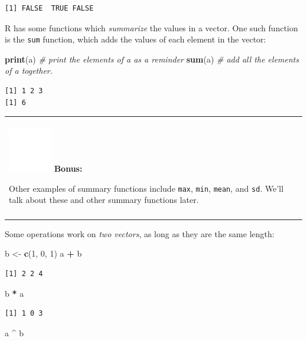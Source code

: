 \documentclass[
]{book}
\newenvironment{Shaded}{\begin{snugshade}}{\end{snugshade}}
\newcommand{\CommentTok}[1]{\textcolor[rgb]{0.56,0.35,0.01}{\textit{#1}}}
\newcommand{\DecValTok}[1]{\textcolor[rgb]{0.00,0.00,0.81}{#1}}
\newcommand{\KeywordTok}[1]{\textcolor[rgb]{0.13,0.29,0.53}{\textbf{#1}}}
\newcommand{\NormalTok}[1]{#1}
\newcommand{\OperatorTok}[1]{\textcolor[rgb]{0.81,0.36,0.00}{\textbf{#1}}}
\newcommand{\StringTok}[1]{\textcolor[rgb]{0.31,0.60,0.02}{#1}}
\newenvironment{bonus}
{
  \begin{center}
  \begin{tabular}{|>{\columncolor{bonus}\color{white}}p{0.9\textwidth}|}\hline\\
  \includegraphics[scale=0.1]{src/images/sun-fill-invert.png}
  \textbf{Bonus:}
}
{\\\\\hline
  \end{tabular}
  \end{center}
}
\begin{document}
\begin{verbatim}
[1] FALSE  TRUE FALSE
\end{verbatim}

R has some functions which \emph{summarize} the values in a vector.
One such function is the \texttt{sum} function, which adds the values of each element in the vector:

\begin{Shaded}
\begin{Highlighting}[]
\KeywordTok{print}\NormalTok{(a)  }\CommentTok{# print the elements of a as a reminder}
\KeywordTok{sum}\NormalTok{(a)    }\CommentTok{# add all the elements of a together.}
\end{Highlighting}
\end{Shaded}

\begin{verbatim}
[1] 1 2 3
[1] 6
\end{verbatim}

\begin{bonus}
Other examples of summary functions include \texttt{max}, \texttt{min},
\texttt{mean}, and \texttt{sd}. We'll talk about these and other summary
functions later.
\end{bonus}

Some operations work on \emph{two vectors}, as long as they are the same length:

\begin{Shaded}
\begin{Highlighting}[]
\NormalTok{b <-}\StringTok{ }\KeywordTok{c}\NormalTok{(}\DecValTok{1}\NormalTok{, }\DecValTok{0}\NormalTok{, }\DecValTok{1}\NormalTok{)}
\NormalTok{a }\OperatorTok{+}\StringTok{ }\NormalTok{b}
\end{Highlighting}
\end{Shaded}

\begin{verbatim}
[1] 2 2 4
\end{verbatim}

\begin{Shaded}
\begin{Highlighting}[]
\NormalTok{b }\OperatorTok{*}\StringTok{ }\NormalTok{a}
\end{Highlighting}
\end{Shaded}

\begin{verbatim}
[1] 1 0 3
\end{verbatim}

\begin{Shaded}
\begin{Highlighting}[]
\NormalTok{a }\OperatorTok{^}\StringTok{ }\NormalTok{b}
\end{Highlighting}
\end{Shaded}
\end{document}
